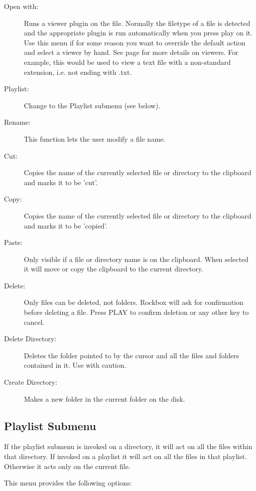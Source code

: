 \begin{description}
\item [Open with:] 
  Runs a viewer plugin on the file. Normally the filetype of a file is detected
  and the appropriate plugin is run automatically when you press play on it.
  Use this menu if for some reason you want to override the default action and
  select a viewer by hand.  See page \textmd{\pageref{ref:Viewersplugins}} for
  more details on viewers. For example, this would be used to view a text file
  with a non-standard extension, i.e. not ending with .txt.
\item [Playlist:]
  Change to the Playlist submenu (see below).
\item [Rename:]
  This function lets the user modify a file name.
\item [Cut:]
  Copies the name of the currently selected file or directory to the clipboard
  and marks it to be 'cut'.
\item [Copy:]
  Copies the name of the currently selected file or directory to the clipboard
  and marks it to be 'copied'.
\item [Paste:]
  Only visible if a file or directory name is on the clipboard. When selected
  it will move or copy the clipboard to the current directory.
\item [Delete:]
  Only files can be deleted, not folders. Rockbox will ask for confirmation
  before deleting a file. Press PLAY to confirm deletion or any other key to
  cancel.
\item [Delete Directory:]
  Deletes the folder pointed to by the cursor and all the files and folders
  contained in it.  Use with caution.
\item [Create Directory:]
  Makes a new folder in the current folder on the disk.
\end{description}

\subsection{\label{ref:Playlistsubmenu}Playlist Submenu}
If the playlist submenu is invoked on a directory, it will act on all the files
within that directory.  If invoked on a playlist it will act on all the files
in that playlist. Otherwise it acts only on the current file.

This menu provides the following options:

